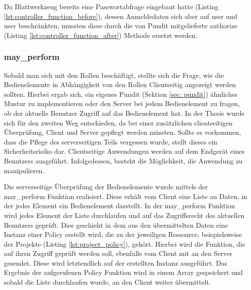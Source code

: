 \begin{minipage}{\textwidth}
	
\end{minipage}

Da Blattwerkzeug bereits eine Passwortabfrage eingebaut hatte (Listing \ref{lst:controller_function_before}), dessen Anmeldedaten sich aber auf user und user beschränkten, mussten diese durch die von Pundit mitgelieferte authorize (Listing \ref{lst:controller_function_after}) Methode ersetzt werden.

\begin{minipage}{\linewidth}
	
\end{minipage}

\begin{minipage}{\linewidth}
	
\end{minipage}

\subsubsection{may\_perform}
\label{sec:server-may-perform}
Sobald man sich mit den Rollen beschäftigt, stellte sich die Frage, wie die Bedienelemente in Abhängigkeit von den Rollen Clientseitig angezeigt werden sollten. Hierbei ergab sich, ein eigenes Pundit (Sektion \ref{sec: pundit}) ähnliches Mustur zu implementieren oder den Server bei jedem Bedienelement zu fragen, ob der aktuelle Benutzer Zugriff auf das Bedienelement hat. In der Thesis wurde sich für den zweiten Weg entschieden, da bei einer zusätzlichen clientseitigen Überprüfung, Client und Server gepflegt werden müssten. Sollte es vorkommen, dass die Pflege des serverseitigen Teils vergessen wurde, stellt dieses ein Sicherheitsrisiko dar. Clientseitige Anwendungen werden auf dem Endgerät eines Benutzers ausgeführt. Infolgedessen, besteht die Möglichkeit, die Anwendung zu manipulieren.

Die serverseitige Überprüfung der Bedienelemente wurde mittels der may\_perform Funktion realisiert. Diese erhält vom Client eine Liste an Daten, in der jedes Element ein Bedienelement darstellt. In der may\_perform Funktion wird jedes Element der Liste durchlaufen und auf das Zugriffsrecht des aktuellen Benutzers geprüft. Dies geschieht in dem aus den übermittelten Daten eine Instanz einer Policy erstellt wird, die zu der jeweiligen Ressource, beispielsweise der Projekte (Listing \ref{lst:project_policy}), gehört. Hierbei wird die Funktion, die auf ihren Zugriff geprüft werden soll, ebenfalls vom Client mit an den Server gesendet. Diese wird letztendlich auf der erstellten Instanz ausgeführt. Das Ergebnis der aufgerufenen Policy Funktion wird in einem Array gespeichert und sobald die Liste durchlaufen wurde, an den Client weiter übermittelt.

